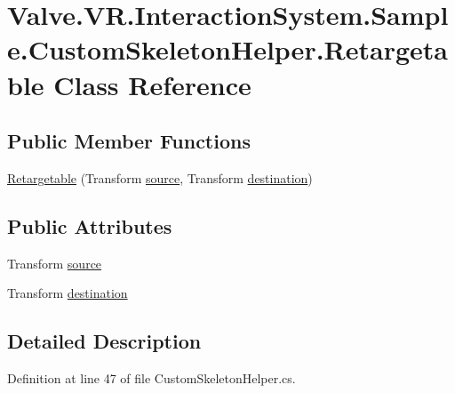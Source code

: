 \hypertarget{class_valve_1_1_v_r_1_1_interaction_system_1_1_sample_1_1_custom_skeleton_helper_1_1_retargetable}{}\section{Valve.\+V\+R.\+Interaction\+System.\+Sample.\+Custom\+Skeleton\+Helper.\+Retargetable Class Reference}
\label{class_valve_1_1_v_r_1_1_interaction_system_1_1_sample_1_1_custom_skeleton_helper_1_1_retargetable}
\subsection*{Public Member Functions}
\begin{DoxyCompactItemize}
\item 
\mbox{\hyperlink{class_valve_1_1_v_r_1_1_interaction_system_1_1_sample_1_1_custom_skeleton_helper_1_1_retargetable_aa82f2e6c88367f1b985a12f18b1ed671}{Retargetable}} (Transform \mbox{\hyperlink{class_valve_1_1_v_r_1_1_interaction_system_1_1_sample_1_1_custom_skeleton_helper_1_1_retargetable_a67db91af4a5dcdb39f9abf0ba38304cf}{source}}, Transform \mbox{\hyperlink{class_valve_1_1_v_r_1_1_interaction_system_1_1_sample_1_1_custom_skeleton_helper_1_1_retargetable_a14f8ce3f0209bd4232360607062d0efd}{destination}})
\end{DoxyCompactItemize}
\subsection*{Public Attributes}
\begin{DoxyCompactItemize}
\item 
Transform \mbox{\hyperlink{class_valve_1_1_v_r_1_1_interaction_system_1_1_sample_1_1_custom_skeleton_helper_1_1_retargetable_a67db91af4a5dcdb39f9abf0ba38304cf}{source}}
\item 
Transform \mbox{\hyperlink{class_valve_1_1_v_r_1_1_interaction_system_1_1_sample_1_1_custom_skeleton_helper_1_1_retargetable_a14f8ce3f0209bd4232360607062d0efd}{destination}}
\end{DoxyCompactItemize}


\subsection{Detailed Description}


Definition at line 47 of file Custom\+Skeleton\+Helper.\+cs.



